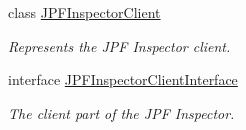 \begin{DoxyCompactItemize}
class \hyperlink{classgov_1_1nasa_1_1jpf_1_1inspector_1_1client_1_1_j_p_f_inspector_client}{J\+P\+F\+Inspector\+Client}
\begin{DoxyCompactList}\small\item\em Represents the J\+PF Inspector client. \end{DoxyCompactList}\item 
interface \hyperlink{interfacegov_1_1nasa_1_1jpf_1_1inspector_1_1client_1_1_j_p_f_inspector_client_interface}{J\+P\+F\+Inspector\+Client\+Interface}
\begin{DoxyCompactList}\small\item\em The client part of the J\+PF Inspector. \end{DoxyCompactList}\end{DoxyCompactItemize}
